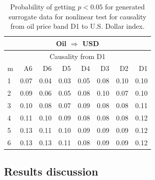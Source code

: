 %
%
\begin{table}[H]
\begin{center}
\begin{tabular}{l|r r r r r r r}
\hline\hline
\multicolumn{8}{c}{Oil $\Rightarrow$ USD}\\
\hline
\multicolumn{8}{c}{Causality from D1}\\
\hline\hline
m & A6 & D6 & D5 & D4 & D3 & D2 & D1 \\
\hline
1 & 0.07 & 0.04 & 0.03 & 0.05 & 0.08 & 0.10 & 0.10 \\
2 & 0.09 & 0.06 & 0.05 & 0.08 & 0.10 & 0.07 & 0.10 \\
3 & 0.10 & 0.08 & 0.07 & 0.09 & 0.08 & 0.08 & 0.11 \\
4 & 0.11 & 0.10 & 0.09 & 0.08 & 0.08 & 0.08 & 0.12 \\
5 & 0.13 & 0.11 & 0.10 & 0.09 & 0.09 & 0.09 & 0.12 \\
6 & 0.13 & 0.13 & 0.11 & 0.08 & 0.09 & 0.09 & 0.12 \\
\hline\hline
\end{tabular}
\caption{Probability of getting $p < 0.05$ for generated surrogate data for nonlinear test for causality from oil price band D1 to U.S. Dollar index.}
\end{center}
\end{table}

\newpage
\subsection{Results discussion}

